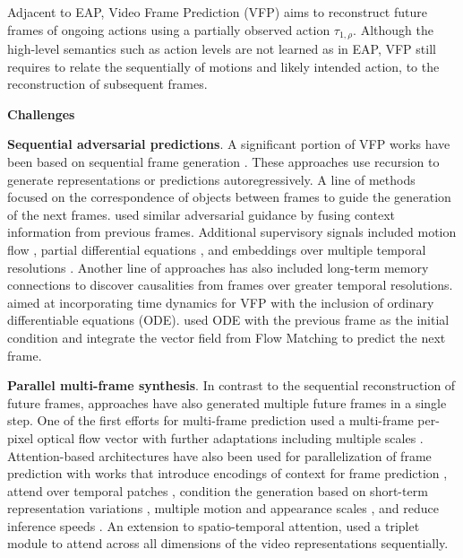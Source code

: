\documentclass[smallextended,twocolumn,natbib]{svjour3}
\begin{document}
Adjacent to EAP, Video Frame Prediction (VFP) aims to reconstruct future frames of ongoing actions using a partially observed action $\tau_{1,\rho}$. Although the high-level semantics such as action levels are not learned as in EAP, VFP still requires to relate the sequentially of motions and likely intended action, to the reconstruction of subsequent frames.

\noindent
\textbf{Challenges}


\noindent
\textbf{Sequential adversarial predictions}. A significant portion of VFP works have been based on sequential frame generation \citep{castrejon2019improved,chaabane2020looking,chang2021mau,chang2022strpm,chen2017learning,guen2020disentangling,hwang2019adversarial,jin2020exploring,liang2017dual,villegas2018hierarchical,wang2018predrnn++,wu2021motionrnn}. These approaches use recursion to generate representations or predictions autoregressively. A line of methods \citep{chen2017learning,jin2017video} focused on the correspondence of objects between frames to guide the generation of the next frames. \citet{castrejon2019improved} used similar adversarial guidance by fusing context information from previous frames. Additional supervisory signals included motion flow \citep{liang2017dual}, partial differential equations \citep{guen2020disentangling}, and embeddings over multiple temporal resolutions \citep{gao2022simvp}. Another line of approaches \citep{chang2021mau,villegas2018hierarchical,wang2018predrnn++} has also included long-term memory connections to discover causalities from frames over greater temporal resolutions. \citet{park2021vid} aimed at incorporating time dynamics for VFP with the inclusion of ordinary differentiable equations (ODE). \citet{davtyan2023efficient} used ODE with the previous frame as the initial condition and integrate the vector field from Flow Matching \citep{lipman2022flow} to predict the next frame. 


\noindent
\textbf{Parallel multi-frame synthesis}. In contrast to the sequential reconstruction of future frames, approaches have also generated multiple future frames in a single step.
One of the first efforts for multi-frame prediction \citep{liu2017video} used a multi-frame per-pixel optical flow vector with further adaptations including multiple scales \citep{hu2023dynamic}. Attention-based architectures have also been used for parallelization of frame prediction with works that introduce encodings of context for frame prediction \citep{ye2023unified}, attend over temporal patches \citep{tan2023temporal}, condition the generation based on short-term representation variations \citep{hu2023dynamic,smith2024convolutional}, multiple motion and appearance scales \citep{zhong2023mmvp}, and reduce inference speeds \citep{ye2022vptr,tang2024vmrnn}. An extension to spatio-temporal attention, \citet{nie2024triplet} used a triplet module to attend across all dimensions of the video representations sequentially.
\end{document}

